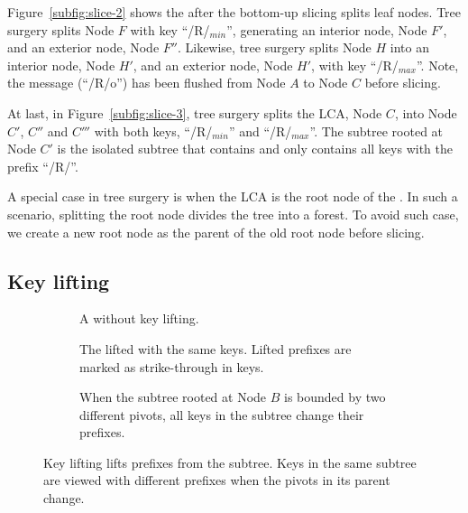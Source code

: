 Figure~\ref{subfig:slice-2} shows the \bet after the bottom-up slicing splits
leaf nodes.
Tree surgery splits Node $F$ with key ``/R/$_{min}$'', generating an interior
node, Node $F'$, and an exterior node, Node $F''$.
Likewise, tree surgery splits Node $H$ into an interior node, Node $H'$, and
an exterior node, Node $H'$, with key ``/R/$_{max}$''.
Note, the message \delm(``/R/o'') has been flushed from Node $A$ to Node $C$
before slicing.

At last, in Figure~\ref{subfig:slice-3}, tree surgery splits the LCA, Node $C$,
into Node $C'$, $C''$ and $C'''$ with both keys, ``/R/$_{min}$'' and
``/R/$_{max}$''.
The subtree rooted at Node $C'$ is the isolated subtree that contains and
only contains all keys with the prefix ``/R/''.

A special case in tree surgery is when the LCA is the root node of the \bet.
In such a scenario, splitting the root node divides the tree into a forest.
To avoid such case, we create a new root node as the parent of the old root
node before slicing.

\subsection{Key lifting}
\label{sec:rr:op:lift}

\begin{figure}
    \begin{subfigure}{\textwidth}
        \centering
        
        \caption{\label{subfig:lift-0} A \bet without key lifting.}
    \end{subfigure}
    \begin{subfigure}{\textwidth}
        \centering
        
        \caption{\label{subfig:lift-1} The lifted \bet with the same keys.
            Lifted prefixes are marked as strike-through in keys.}
    \end{subfigure}
    \begin{subfigure}{\textwidth}
        \centering
        
        \caption{\label{subfig:lift-2} When the subtree rooted at Node $B$ is
            bounded by two different pivots, all keys in the subtree change
            their prefixes.}
    \end{subfigure}
    \caption[An key lifting example]{\label{fig:lift}
        Key lifting lifts prefixes from the subtree. Keys in the same subtree
        are viewed with different prefixes when the pivots in its parent
        change.}
\end{figure}

